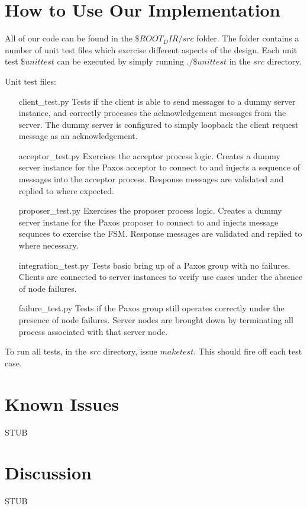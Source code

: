 \documentclass{article}
\begin{document}

\section{How to Use Our Implementation}

All of our code can be found in the $\${ROOT_DIR}/src$ folder.
The folder contains a number of unit test files which exercise different aspects of the design.
Each unit test $\${unittest}$ can be executed by simply running $./\${unittest}$ in the $src$ directory.

Unit test files:
\begin{itemize}
\item [client_test.py] Tests if the client is able to send messages to a dummy server instance, and correctly processes the acknowledgement messages from the server. 
  The dummy server is configured to simply loopback the client request message as an acknowledgement.
\item [acceptor_test.py] Exercises the acceptor process logic. 
  Creates a dummy server instance for the Paxos acceptor to connect to and injects a sequence of messages into the acceptor process. 
  Response messages are validated and replied to where expected.
\item [proposer_test.py] Exercises the proposer process logic.
  Creates a dummy server instane for the Paxos proposer to connect to and injects message sequnces to exercise the FSM.
  Response messages are validated and replied to where necessary.
\item [integration_test.py] Tests basic bring up of a Paxos group with no failures.
  Clients are connected to server instances to verify use cases under the absence of node failures.
\item [failure_test.py] Tests if the Paxos group still operates correctly under the presence of node failures.
  Server nodes are brought down by terminating all process associated with that server node.
\end{itemize}

To run all tests, in the $src$ directory, issue $make test$.
This should fire off each test case.


\section{Known Issues}

STUB


\section{Discussion}

STUB
\end{document}
